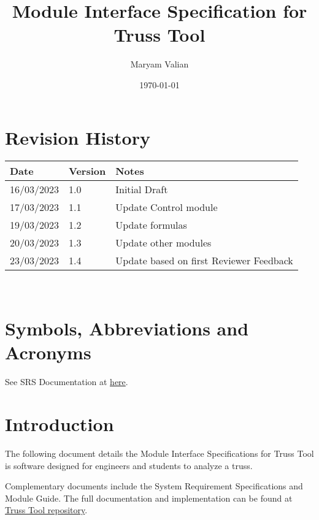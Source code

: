 \documentclass[12pt, titlepage]{article}
\begin{document}
\title{Module Interface Specification for Truss Tool}

\author{Maryam Valian}

\date{\today}

\maketitle


\section{Revision History}

\begin{tabularx}{\textwidth}{p{3cm}p{2cm}X}
\toprule {\bf Date} & {\bf Version} & {\bf Notes}\\
\midrule
16/03/2023 & 1.0 & Initial Draft\\
17/03/2023 & 1.1 & Update Control module\\
19/03/2023 & 1.2 & Update formulas\\
20/03/2023 & 1.3 & Update other modules\\
23/03/2023 & 1.4 & Update based on first Reviewer Feedback\\
\bottomrule
\end{tabularx}

~\newpage

\section{Symbols, Abbreviations and Acronyms}

See SRS Documentation at \href{https://github.com/Maryamvalian/project741/blob/main/docs/SRS/SRS.pdf}{here}. 
\newpage

\tableofcontents

\newpage


\section{Introduction}

The following document details the Module Interface Specifications for
Truss Tool is software designed for engineers and students to analyze a truss.

Complementary documents include the System Requirement Specifications
and Module Guide.  The full documentation and implementation can be
found at \href{https://github.com/Maryamvalian/project741}{Truss Tool repository}.
\end{document}
